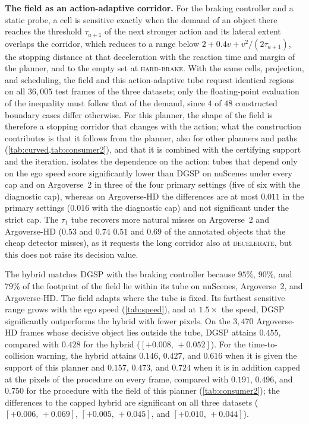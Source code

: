 \documentclass[10pt,letterpaper]{article}
\newcommand{\method}{DGSP\xspace}
\newcommand{\ci}[2]{[#1,\allowbreak\,#2]}
\theoremstyle{remark}
\theoremstyle{plain}
\theoremstyle{definition}
\begin{document}
\noindent\textbf{The field as an action-adaptive corridor.}
For the braking controller and a static probe, a cell is sensitive exactly when the demand of an object there reaches the threshold $\tau_{a+1}$ of the next stronger action and its lateral extent overlaps the corridor, which reduces to a range below $2+0.4v+v^2/(2\tau_{a+1})$, the stopping distance at that deceleration with the reaction time and margin of the planner, and to the empty set at \textsc{hard-brake}.
With the same cells, projection, and scheduling, the field and this action-adaptive tube request identical regions on all $36{,}005$ test frames of the three datasets; only the floating-point evaluation of the inequality must follow that of the demand, since $4$ of $48$ constructed boundary cases differ otherwise.
For this planner, the shape of the field is therefore a stopping corridor that changes with the action; what the construction contributes is that it follows from the planner, also for other planners and paths (\cref{tab:curved,tab:consumer2}), and that it is combined with the certifying support and the iteration.
 isolates the dependence on the action: tubes that depend only on the ego speed score significantly lower than \method on nuScenes under every cap and on Argoverse~2 in three of the four primary settings (five of six with the diagnostic cap), whereas on Argoverse-HD the differences are at most $0.011$ in the primary settings ($0.016$ with the diagnostic cap) and not significant under the strict cap.
The $\tau_1$ tube recovers more natural misses on Argoverse~2 and Argoverse-HD ($0.53$ and $0.74$ \vs $0.51$ and $0.69$ of the annotated objects that the cheap detector misses), as it requests the long corridor also at \textsc{decelerate}, but this does not raise its decision value.

The hybrid matches \method with the braking controller because $95\%$, $90\%$, and $79\%$ of the footprint of the field lie within its tube on nuScenes, Argoverse~2, and Argoverse-HD.
The field adapts where the tube is fixed.
Its farthest sensitive range grows with the ego speed (\cref{tab:speed}), and at $1.5\times$ the speed, \method significantly outperforms the hybrid with fewer pixels.
On the $3{,}470$ Argoverse-HD frames whose decisive object lies outside the tube, \method attains $0.455$, compared with $0.428$ for the hybrid ($\ci{+0.008}{+0.052}$).
For the time-to-collision warning, the hybrid attains $0.146$, $0.427$, and $0.616$ when it is given the support of this planner and $0.157$, $0.473$, and $0.724$ when it is in addition capped at the pixels of the procedure on every frame, compared with $0.191$, $0.496$, and $0.750$ for the procedure with the field of this planner (\cref{tab:consumer2}); the differences to the capped hybrid are significant on all three datasets ($\ci{+0.006}{+0.069}$, $\ci{+0.005}{+0.045}$, and $\ci{+0.010}{+0.044}$).
\end{document}
